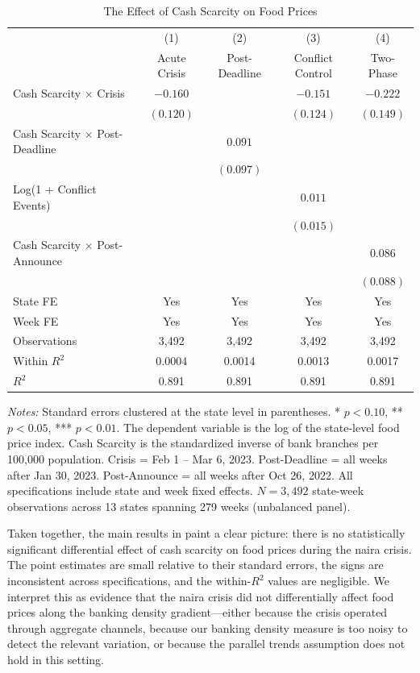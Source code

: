 \documentclass[12pt]{article}
\begin{document}
\begin{table}[H]
\centering
\caption{The Effect of Cash Scarcity on Food Prices}
\begin{threeparttable}
\begin{tabular}{lcccc}
\toprule
& (1) & (2) & (3) & (4) \\
& Acute Crisis & Post-Deadline & Conflict Control & Two-Phase \\
\midrule
Cash Scarcity $\times$ Crisis & $-0.160$ & & $-0.151$ & $-0.222$ \\
& $(0.120)$ & & $(0.124)$ & $(0.149)$ \\
Cash Scarcity $\times$ Post-Deadline & & $0.091$ & & \\
& & $(0.097)$ & & \\
Log(1 + Conflict Events) & & & $0.011$ & \\
& & & $(0.015)$ & \\
Cash Scarcity $\times$ Post-Announce & & & & $0.086$ \\
& & & & $(0.088)$ \\
\addlinespace
State FE & Yes & Yes & Yes & Yes \\
Week FE & Yes & Yes & Yes & Yes \\
\addlinespace
Observations & 3,492 & 3,492 & 3,492 & 3,492 \\
Within $R^2$ & 0.0004 & 0.0014 & 0.0013 & 0.0017 \\
$R^2$ & 0.891 & 0.891 & 0.891 & 0.891 \\
\bottomrule
\end{tabular}
\begin{tablenotes}[flushleft]
\small
\item \textit{Notes:} Standard errors clustered at the state level in parentheses. * $p<0.10$, ** $p<0.05$, *** $p<0.01$. The dependent variable is the log of the state-level food price index. Cash Scarcity is the standardized inverse of bank branches per 100,000 population. Crisis = Feb 1 -- Mar 6, 2023. Post-Deadline = all weeks after Jan 30, 2023. Post-Announce = all weeks after Oct 26, 2022. All specifications include state and week fixed effects. $N = 3{,}492$ state-week observations across 13 states spanning 279 weeks (unbalanced panel).
\end{tablenotes}
\end{threeparttable}
\label{tab:main}
\end{table}

Taken together, the main results in  paint a clear picture: there is no statistically significant differential effect of cash scarcity on food prices during the naira crisis. The point estimates are small relative to their standard errors, the signs are inconsistent across specifications, and the within-$R^2$ values are negligible. We interpret this as evidence that the naira crisis did not differentially affect food prices along the banking density gradient---either because the crisis operated through aggregate channels, because our banking density measure is too noisy to detect the relevant variation, or because the parallel trends assumption does not hold in this setting.
\end{document}
